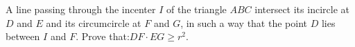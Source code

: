 A line passing through the incenter $I$ of the triangle $ABC$ intersect its incircle at $D$ and $E$ and its circumcircle at $F$ and $G$,  in such a way that the point $D$ lies between $I$ and $F$. Prove that:$DF \cdot EG \geq r^{2}$.